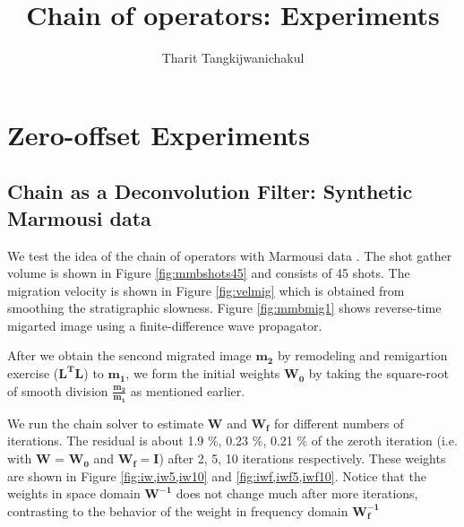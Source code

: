 \title{Chain of operators: Experiments}
\renewcommand{\thefootnote}{\fnsymbol{footnote}}
\relax{}
\author{Tharit Tangkijwanichakul}
\label{ch:chapter-lsrtm}

\maketitle

\section{Zero-offset Experiments}

\subsection{Chain as a Deconvolution Filter: Synthetic Marmousi data}
%

We test the idea of the chain of operators with Marmousi data \cite[]{versteeg1994}. The shot gather volume is shown in Figure \ref{fig:mmbshots45} and consists of 45 shots. The migration velocity is shown in Figure \ref{fig:velmig} which is obtained from smoothing the stratigraphic slowness. Figure \ref{fig:mmbmig1} shows reverse-time migarted image using a finite-difference wave propagator. 



%

After we obtain the sencond migrated image $\mathbf{m_2}$ by remodeling and remigartion exercise ($\mathbf{L^{T}L}$) to $\mathbf{m_1}$, we form the initial weights $\mathbf{W_0}$ by taking the square-root of smooth division $\mathbf{\frac{m_2}{m_1}}$ as mentioned earlier.

We run the chain solver to estimate $\mathbf{W}$ and $\mathbf{W_f}$ for different numbers of iterations. The residual is about 1.9 $\%$, 0.23 $\%$, 0.21 $\%$ of the zeroth iteration (i.e. with $\mathbf{W}$ = $\mathbf{W_0}$ and $\mathbf{W_f} = \mathbf{I}$) after 2, 5, 10 iterations respectively. These weights are shown in Figure \ref{fig:iw,iw5,iw10} and \ref{fig:iwf,iwf5,iwf10}. Notice that the weights in space domain $\mathbf{W^{-1}}$ does not change much after more iterations, contrasting to the behavior of the weight in frequency domain $\mathbf{W_f^{-1}}$

